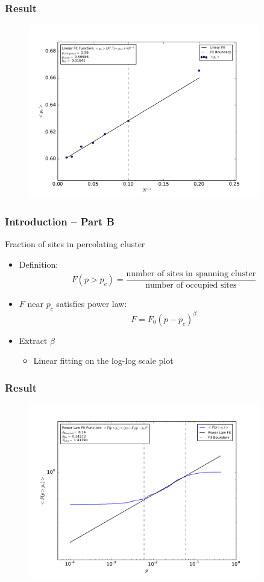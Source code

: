 \documentclass[mathserif,18pt,xcolor=table]{beamer}
\begin{document}
\begin{frame}
	\frametitle{Result}
	\begin{figure}
  	\centering
  	\includegraphics[width=0.9\textwidth]{../output/plots_for_paper/pc_ave_vs_InverseN.pdf}
	\end{figure}
\end{frame}


\begin{frame}
	\frametitle{Introduction -- Part B}
	Fraction of sites in percolating cluster
	\begin{itemize}
		\item Definition:
			\begin{equation}
			F(p>p_c)=\frac{\text{number of sites in spanning cluster}}{\text{number of occupied sites}}
			\end{equation}
		\item $F$ near $p_c$ satisfies power law:
			\begin{equation}
			F=F_0(p-p_c)^\beta
			\end{equation}
		\item Extract $\beta$
			\begin{itemize}
				\item Linear fitting on the log-log scale plot
			\end{itemize}
	\end{itemize}
\end{frame}


\begin{frame}
	\frametitle{Result}
	\begin{figure}
  	\centering
  	\includegraphics[width=0.9\textwidth]{../output/plots_for_paper/F_ave_vs_p.pdf}
	\end{figure}
\end{frame}
\end{document}

